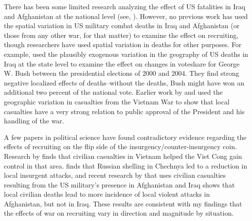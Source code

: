 \documentclass[12pt] {article}
\begin{document}
There has been some limited research analyzing the effect of US fatalities
in Iraq and Afghanistan at the national level (see\cite{BigRandDocument}, \cite{Simon-Warner-DEATHS!}).
However, no previous work has used the spatial variation in US military combat deaths in Iraq and Afghanistan (or those from any other war, for that matter) to examine the effect
on recruiting, though researchers have used spatial variation
in deaths for other purposes. For example, \cite{Ted-Miguel-Bush-Deaths}
used the plausibly exogenous variation in the geography of US deaths in Iraq at the state level to examine the effect on changes in voteshare for George W. Bush between
the presidential elections of 2000 and 2004. They find strong negative
localized effects of deaths--without the deaths, Bush might have won
an additional two percent of the national vote. Earlier work by \cite{SSGartner-WarCasualtiesPublicOpinion}
and \cite{SSGartnerAllPoliticsLocal} used the geographic variation
in casualties from the Vietnam War to show that local casualties have
a very strong relation to public approval of the President and his
handling of the war. %

A few papers in political science have found contradictory evidence regarding the effects of recruiting on the flip side of the insurgency/counter-insurgency coin. Research by \cite {Kocher-Vietnam} finds that civilian casualties in Vietnam helped the Viet Cong gain control in that area. \cite {Lyall} finds that Russian shelling in Chechnya led to a reduction in local insurgent attacks, and recent research by \cite{AfghanIraqCasualties} that uses civilian casualties resulting from the US military's presence in Afghanistan and Iraq shows that local civilian deaths lead to more incidence
of local violent attacks in Afghanistan, but not in Iraq. These results are consistent with my findings that the effects of war on recruiting vary in direction and magnitude by situation. 


\end{document}
